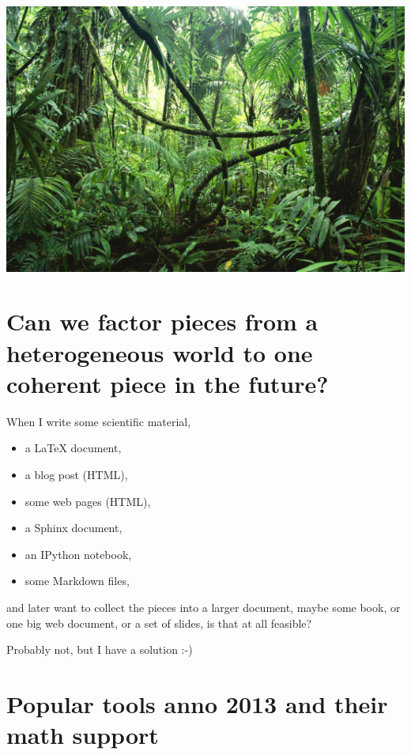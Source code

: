 \documentclass[%
twoside,                 %
final,                   %
chapterprefix=true,      %
open=right               %
10pt]{book}
\begin{document}
\begin{center}  %
  \centerline{\includegraphics[width=0.9\linewidth]{fig/jungle_with_mess.jpg}}
\end{center}



\section*{Can we factor pieces from a heterogeneous world to one coherent piece in the future?}

When I write some scientific material,

\begin{itemize}
 \item a {\LaTeX} document,

 \item a blog post (HTML),

 \item some web pages (HTML),

 \item a Sphinx document,

 \item an IPython notebook,

 \item some Markdown files,
\end{itemize}

\noindent
and later want to collect the pieces into a larger document, maybe
some book, or one big web document, or a set of slides,
is that at all feasible?

Probably not, but I have a solution :-)

\section*{Popular tools anno 2013 and their math support}
\end{document}

